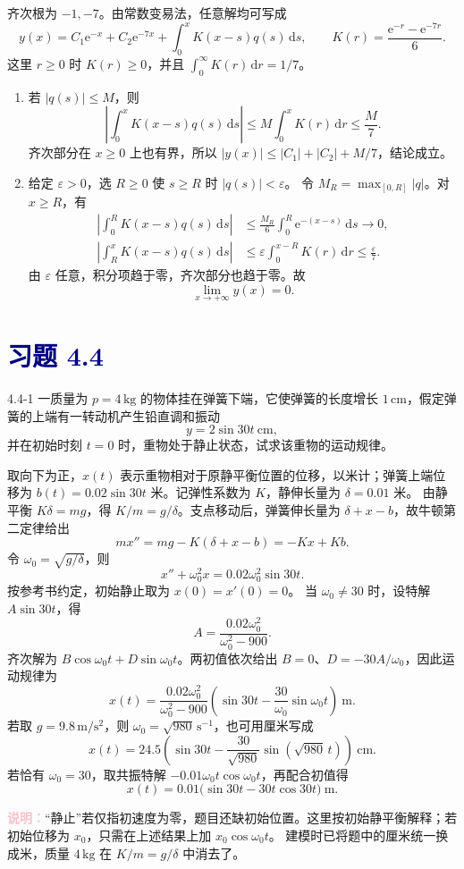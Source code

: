 \documentclass[UTF8,a4paper,11pt]{ctexart}
\newcommand{\dd}{\,\mathrm d}
\newcommand{\e}{\mathrm e}
\newcommand{\note}[1]{\par\smallskip\noindent\textcolor{pink}{\bfseries 说明：}#1\par\smallskip}
\newcommand{\sect}[1]{\section*{\textcolor{navy}{习题 #1}}}
\begin{document}
\begin{solution}
齐次根为 $-1,-7$。由常数变易法，任意解均可写成
\[
y(x)=C_1\e^{-x}+C_2\e^{-7x}
+\int_0^xK(x-s)q(s)\dd s,
\qquad K(r)=\frac{\e^{-r}-\e^{-7r}}6.
\]
这里 $r\ge0$ 时 $K(r)\ge0$，并且 $\int_0^{\infty}K(r)\dd r=1/7$。
\begin{enumerate}[label=(\arabic*)]
\item 若 $|q(s)|\le M$，则
\[
\left|\int_0^xK(x-s)q(s)\dd s\right|
\le M\int_0^xK(r)\dd r\le\frac M7.
\]
齐次部分在 $x\ge0$ 上也有界，所以
$|y(x)|\le |C_1|+|C_2|+M/7$，结论成立。

\item 给定 $\varepsilon>0$，选 $R\ge0$ 使 $s\ge R$ 时 $|q(s)|<\varepsilon$。
令 $M_R=\max_{[0,R]}|q|$。对 $x\ge R$，有
\[
\begin{aligned}
\left|\int_0^RK(x-s)q(s)\dd s\right|
&\le\frac{M_R}{6}\int_0^R\e^{-(x-s)}\dd s\longrightarrow0,\\
\left|\int_R^xK(x-s)q(s)\dd s\right|
&\le\varepsilon\int_0^{x-R}K(r)\dd r\le\frac\varepsilon7.
\end{aligned}
\]
由 $\varepsilon$ 任意，积分项趋于零，齐次部分也趋于零。故
\[
\boxed{\lim_{x\to+\infty}y(x)=0.}
\]
\end{enumerate}
\end{solution}

\sect{4.4}
\begin{problem}{4.4-1}
一质量为 $p=4\,\mathrm{kg}$ 的物体挂在弹簧下端，它使弹簧的长度增长 $1\,\mathrm{cm}$，假定弹簧的上端有一转动机产生铅直调和振动
  \[
    y=2\sin 30t\ \mathrm{cm},
  \]
  并在初始时刻 $t=0$ 时，重物处于静止状态，试求该重物的运动规律。
\end{problem}

\begin{solution}
取向下为正，$x(t)$ 表示重物相对于原静平衡位置的位移，以米计；弹簧上端位移为
$b(t)=0.02\sin30t$ 米。记弹性系数为 $K$，静伸长量为 $\delta=0.01$ 米。
由静平衡 $K\delta=mg$，得 $K/m=g/\delta$。支点移动后，弹簧伸长量为 $\delta+x-b$，故牛顿第二定律给出
\[
mx''=mg-K(\delta+x-b)=-Kx+Kb.
\]
令 $\omega_0=\sqrt{g/\delta}$，则
\[
x''+\omega_0^2x=0.02\omega_0^2\sin30t.
\]
按参考书约定，初始静止取为 $x(0)=x'(0)=0$。
当 $\omega_0\ne30$ 时，设特解 $A\sin30t$，得
\[
A=\frac{0.02\omega_0^2}{\omega_0^2-900}.
\]
齐次解为 $B\cos\omega_0t+D\sin\omega_0t$。两初值依次给出 $B=0$、$D=-30A/\omega_0$，因此运动规律为
\[
\boxed{x(t)=\frac{0.02\omega_0^2}{\omega_0^2-900}
\left(\sin30t-\frac{30}{\omega_0}\sin\omega_0t\right)\ \mathrm m.}
\]
若取 $g=9.8\,\mathrm{m/s^2}$，则 $\omega_0=\sqrt{980}\,\mathrm{s^{-1}}$，也可用厘米写成
\[
\boxed{x(t)=24.5\left(\sin30t-\frac{30}{\sqrt{980}}\sin(\sqrt{980}\,t)\right)\ \mathrm{cm}.}
\]
若恰有 $\omega_0=30$，取共振特解 $-0.01\omega_0t\cos\omega_0t$，再配合初值得
\[
x(t)=0.01\bigl(\sin30t-30t\cos30t\bigr)\ \mathrm m.
\]
\note{“静止”若仅指初速度为零，题目还缺初始位置。这里按初始静平衡解释；若初始位移为 $x_0$，只需在上述结果上加 $x_0\cos\omega_0t$。
建模时已将题中的厘米统一换成米，质量 $4\,\mathrm{kg}$ 在 $K/m=g/\delta$ 中消去了。}
\end{solution}
\end{document}
